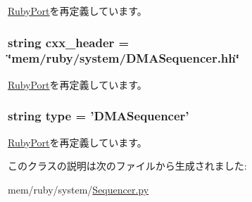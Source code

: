 \hyperlink{classSequencer_1_1RubyPort_a2508e7d3baa8674cfa2657be0bbd1361}{RubyPort}を再定義しています。\hypertarget{classSequencer_1_1DMASequencer_a17da7064bc5c518791f0c891eff05fda}{
\subsubsection[{cxx\_\-header}]{\setlength{\rightskip}{0pt plus 5cm}string {\bf cxx\_\-header} = \char`\"{}mem/ruby/{\bf system}/DMASequencer.hh\char`\"{}}}
\label{classSequencer_1_1DMASequencer_a17da7064bc5c518791f0c891eff05fda}


\hyperlink{classSequencer_1_1RubyPort_a17da7064bc5c518791f0c891eff05fda}{RubyPort}を再定義しています。\hypertarget{classSequencer_1_1DMASequencer_acce15679d830831b0bbe8ebc2a60b2ca}{
\subsubsection[{type}]{\setlength{\rightskip}{0pt plus 5cm}string {\bf type} = '{\bf DMASequencer}'}}
\label{classSequencer_1_1DMASequencer_acce15679d830831b0bbe8ebc2a60b2ca}


\hyperlink{classSequencer_1_1RubyPort_acce15679d830831b0bbe8ebc2a60b2ca}{RubyPort}を再定義しています。

このクラスの説明は次のファイルから生成されました:\begin{DoxyCompactItemize}
\item 
mem/ruby/system/\hyperlink{Sequencer_8py}{Sequencer.py}\end{DoxyCompactItemize}
